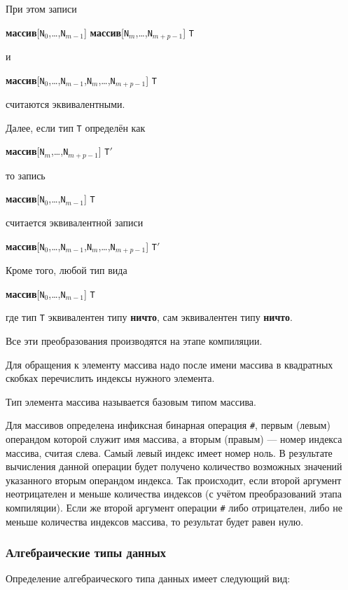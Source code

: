 \documentclass[10pt]{report}
\begin{document}
При этом записи
\begin{center}
\textbf{массив}[\texttt{N}$_0$,\dots,\texttt{N}$_{m-1}$] \textbf{массив}[\texttt{N}$_{m}$,\dots,\texttt{N}$_{m+p-1}$] \texttt{T}
\end{center}
и
\begin{center}
\textbf{массив}[\texttt{N}$_0$,\dots,\texttt{N}$_{m-1}$,\texttt{N}$_{m}$,\dots,\texttt{N}$_{m+p-1}$] \texttt{T}
\end{center}
считаются эквивалентными.

Далее, если тип \texttt{T} определён как
\begin{center}
\textbf{массив}[\texttt{N}$_{m}$,\dots,\texttt{N}$_{m+p-1}$] \texttt{T}$'$
\end{center}
то запись
\begin{center}
\textbf{массив}[\texttt{N}$_0$,\dots,\texttt{N}$_{m-1}$] \texttt{T}
\end{center}
считается эквивалентной записи
\begin{center}
\textbf{массив}[\texttt{N}$_0$,\dots,\texttt{N}$_{m-1}$,\texttt{N}$_{m}$,\dots,\texttt{N}$_{m+p-1}$] \texttt{T}$'$
\end{center}

Кроме того, любой тип вида
\begin{center}
\textbf{массив}[\texttt{N}$_0$,\dots,\texttt{N}$_{m-1}$] \texttt{T}
\end{center}
где тип \texttt{T} эквивалентен типу \textbf{ничто}, сам эквивалентен типу \textbf{ничто}.

Все эти преобразования производятся на этапе компиляции.

Для обращения к элементу массива надо после имени массива в квадратных скобках перечислить индексы нужного элемента.

Тип элемента массива называется базовым типом массива.

Для массивов определена инфиксная бинарная операция \texttt{\#}, первым (левым) операндом которой служит имя массива, а вторым (правым) --- номер индекса массива, считая слева.
Самый левый индекс имеет номер ноль. В результате вычисления данной операции будет получено количество возможных значений указанного вторым операндом индекса. Так происходит,
если второй аргумент неотрицателен и меньше количества индексов (с учётом преобразований этапа компиляции). Если же второй аргумент операции \texttt{\#} либо отрицателен, либо
не меньше количества индексов массива, то результат будет равен нулю.

        \subsubsection{Алгебраические типы данных}
Определение алгебраического типа данных имеет следующий вид:
\end{document}
